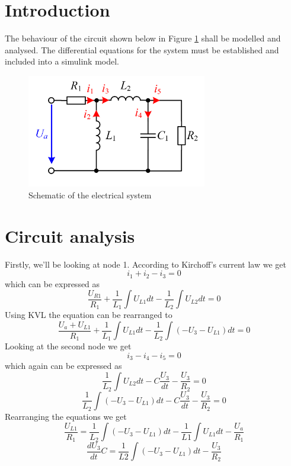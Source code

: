 \section{Introduction}

The behaviour of the circuit shown below in Figure \ref{fig:shematic} shall be modelled and analysed. The differential equations for the system must be established and included into a simulink model.

\begin{figure}[H]
		\centering
		\includegraphics[width=0.7\textwidth]{figures/shematic.png}
		\caption{Schematic of the electrical system}
		\label{fig:shematic}
\end{figure}

\section{Circuit analysis}
Firstly, we'll be looking at node 1. According to Kirchoff's current law we get
\begin{equation} 
i_1+i_2-i_3=0
\end{equation}
which can be expressed as
\begin{equation}
\frac{U_{R1}}{R_1}+\frac{1}{L_1}\int U_{L1} dt -\frac{1}{L_2}\int U_{L2} dt=0
\end{equation}
Using KVL the equation can be rearranged to
\begin{equation}
\frac{U_a+U_{L1}}{R_1}+\frac{1}{L_1}\int U_{L1} dt-\frac{1}{L_2}\int (-U_3-U_{L1})dt=0
\end{equation}
Looking at the second node we get
\begin{equation}
i_3-i_4-i_5=0
\end{equation}
which again can be expressed as
\begin{equation}
\frac{1}{L_2}\int U_{L2} dt-C\frac{U_3}{dt}-\frac{U_3}{R_2}=0
\end{equation}
\begin{equation}
\frac{1}{L_2}\int (-U_3-U_{L1})dt-C\frac{U_3}{dt}-\frac{U_3}{R_2}=0 
\end{equation}
Rearranging the equations we get
\begin{equation}\label{eq:a}
\frac{U_{L1}}{R_1}=\frac{1}{L_2}\int (-U_3-U_{L1})dt-\frac{1}{L1}\int U_{L1}dt-\frac{U_a}{R_1}
\end{equation}
\begin{equation}\label{eq:b}
\frac{dU_3}{dt}C=\frac{1}{L2}\int(-U_3-U_{L1}) dt-\frac{U_3}{R_2}
\end{equation}

